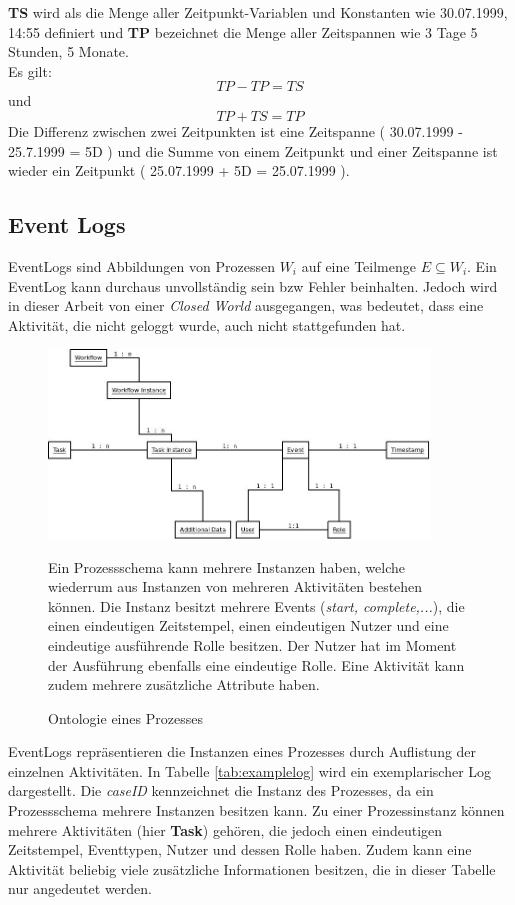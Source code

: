\textbf{TS} wird als die Menge aller Zeitpunkt-Variablen und Konstanten wie 30.07.1999, 14:55 definiert und \textbf{TP} bezeichnet die Menge aller Zeitspannen wie 3 Tage 5 Stunden, 5 Monate.\\
Es gilt: $$TP - TP = TS$$ und $$TP + TS = TP$$ Die Differenz zwischen zwei Zeitpunkten ist eine Zeitspanne ( 30.07.1999 - 25.7.1999 = 5D ) und die Summe von einem Zeitpunkt und einer Zeitspanne ist wieder ein Zeitpunkt ( 25.07.1999 + 5D = 25.07.1999 ).




\subsection{Event Logs}

EventLogs sind Abbildungen von Prozessen $W_i$ auf eine Teilmenge $E \subseteq W_i$. Ein EventLog kann durchaus unvollständig sein bzw Fehler beinhalten. Jedoch wird in dieser Arbeit von einer \textit{Closed World} ausgegangen, was bedeutet, dass eine Aktivität, die nicht geloggt wurde, auch nicht stattgefunden hat.

\begin{figure}[h!]
	\centering
  \includegraphics[width=0.9\textwidth]{Figures/WorkflowOntology}

\small Ein Prozessschema kann mehrere Instanzen haben, welche wiederrum aus Instanzen von mehreren Aktivitäten bestehen können. Die Instanz besitzt mehrere Events (\textit{start, complete,...}), die einen eindeutigen Zeitstempel, einen eindeutigen Nutzer und eine eindeutige ausführende Rolle besitzen. Der Nutzer hat im Moment der Ausführung ebenfalls eine eindeutige Rolle. Eine Aktivität kann zudem mehrere zusätzliche Attribute haben.
	\caption{Ontologie eines Prozesses}
	\label{fig:ontology}
\end{figure}

EventLogs repräsentieren die Instanzen eines Prozesses durch Auflistung der einzelnen Aktivitäten. In Tabelle \ref{tab:examplelog} wird ein exemplarischer Log dargestellt. Die \textit{caseID} kennzeichnet die Instanz des Prozesses, da ein Prozessschema mehrere Instanzen besitzen kann. Zu einer Prozessinstanz können mehrere Aktivitäten (hier \textbf{Task}) gehören, die jedoch einen eindeutigen Zeitstempel, Eventtypen, Nutzer und dessen Rolle haben. Zudem kann eine Aktivität beliebig viele zusätzliche Informationen besitzen, die in dieser Tabelle nur angedeutet werden.

